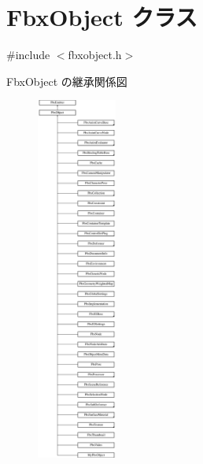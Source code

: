 \hypertarget{class_fbx_object}{}\section{Fbx\+Object クラス}
\label{class_fbx_object}


{\ttfamily \#include $<$fbxobject.\+h$>$}

Fbx\+Object の継承関係図\begin{figure}[H]
\begin{center}
\leavevmode
\includegraphics[height=12.000000cm]{class_fbx_object}
\end{center}
\end{figure}
